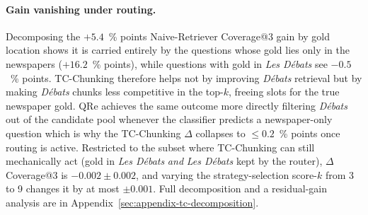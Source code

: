 \paragraph{Gain vanishing under routing.}
Decomposing the $+5.4$~\% points Naive-Retriever Coverage@3 gain by gold
location shows it is carried entirely by the questions whose
gold lies only in the newspapers ($+16.2$~\% points), while questions with
gold in \textit{Les D\'ebats} see $-0.5$~\% points. TC-Chunking therefore helps
not by improving \textit{D\'ebats} retrieval but by making \textit{D\'ebats}
chunks less competitive in the top-$k$, freeing slots for the true
newspaper gold. QRe achieves the same outcome more directly filtering
\textit{D\'ebats} out of the candidate pool whenever the classifier
predicts a newspaper-only question which is why the TC-Chunking
$\Delta$ collapses to $\leq 0.2$~\% points once routing is active. Restricted
to the subset where TC-Chunking can still mechanically act
(gold in \textit{Les D\'ebats} \emph{and} \textit{Les D\'ebats} kept by
the router), $\Delta$ Coverage@3 is $-0.002\pm0.002$, and varying the
strategy-selection score-$k$ from 3 to 9 changes it by at most $\pm 0.001$.
Full decomposition and a residual-gain analysis are in
Appendix~\ref{sec:appendix-tc-decomposition}.


